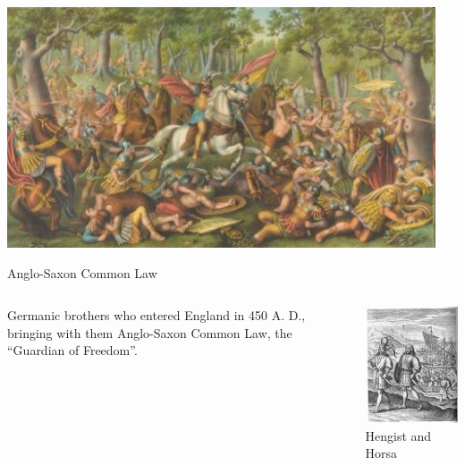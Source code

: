 \begin{frame}
    \centering
    \includegraphics[width=0.95\textwidth]{img/teutoburg.png} \\
\end{frame}

\begin{frame}{Anglo-Saxon Common Law}
    \begin{columns}[onlytextwidth]
            Germanic brothers who entered England in 450 A. D., bringing with them Anglo-Saxon Common Law, the ``Guardian of Freedom''.

            \centering
            \includegraphics[height=0.55\textheight]{img/hengist-horsa.png} \\
            Hengist and Horsa \\
    \end{columns}
\end{frame}


